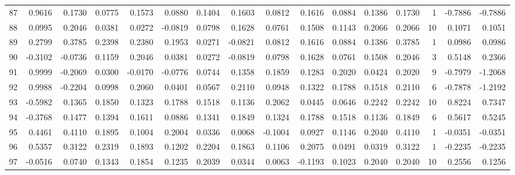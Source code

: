 \begin{tabular}{lrrrrrrrrrrrrrrr}
87  &      0.9616 &  0.1730 &  0.0775 &  0.1573 &  0.0880 &  0.1404 &  0.1603 &  0.0812 &  0.1616 &  0.0884 &   0.1386 &     0.1730 &      1 &                   -0.7886 &                    -0.7886 \\
88  &      0.0995 &  0.2046 &  0.0381 &  0.0272 & -0.0819 &  0.0798 &  0.1628 &  0.0761 &  0.1508 &  0.1143 &   0.2066 &     0.2066 &     10 &                    0.1071 &                     0.1051 \\
89  &      0.2799 &  0.3785 &  0.2398 &  0.2380 &  0.1953 &  0.0271 & -0.0821 &  0.0812 &  0.1616 &  0.0884 &   0.1386 &     0.3785 &      1 &                    0.0986 &                     0.0986 \\
90  &     -0.3102 & -0.0736 &  0.1159 &  0.2046 &  0.0381 &  0.0272 & -0.0819 &  0.0798 &  0.1628 &  0.0761 &   0.1508 &     0.2046 &      3 &                    0.5148 &                     0.2366 \\
91  &      0.9999 & -0.2069 &  0.0300 & -0.0170 & -0.0776 &  0.0744 &  0.1358 &  0.1859 &  0.1283 &  0.2020 &   0.0424 &     0.2020 &      9 &                   -0.7979 &                    -1.2068 \\
92  &      0.9988 & -0.2204 &  0.0998 &  0.2060 &  0.0401 &  0.0567 &  0.2110 &  0.0948 &  0.1322 &  0.1788 &   0.1518 &     0.2110 &      6 &                   -0.7878 &                    -1.2192 \\
93  &     -0.5982 &  0.1365 &  0.1850 &  0.1323 &  0.1788 &  0.1518 &  0.1136 &  0.2062 &  0.0445 &  0.0646 &   0.2242 &     0.2242 &     10 &                    0.8224 &                     0.7347 \\
94  &     -0.3768 &  0.1477 &  0.1394 &  0.1611 &  0.0886 &  0.1341 &  0.1849 &  0.1324 &  0.1788 &  0.1518 &   0.1136 &     0.1849 &      6 &                    0.5617 &                     0.5245 \\
95  &      0.4461 &  0.4110 &  0.1895 &  0.1004 &  0.2004 &  0.0336 &  0.0068 & -0.1004 &  0.0927 &  0.1146 &   0.2040 &     0.4110 &      1 &                   -0.0351 &                    -0.0351 \\
96  &      0.5357 &  0.3122 &  0.2319 &  0.1893 &  0.1202 &  0.2204 &  0.1863 &  0.1106 &  0.2075 &  0.0491 &   0.0319 &     0.3122 &      1 &                   -0.2235 &                    -0.2235 \\
97  &     -0.0516 &  0.0740 &  0.1343 &  0.1854 &  0.1235 &  0.2039 &  0.0344 &  0.0063 & -0.1193 &  0.1023 &   0.2040 &     0.2040 &     10 &                    0.2556 &                     0.1256 \\

\end{tabular}
